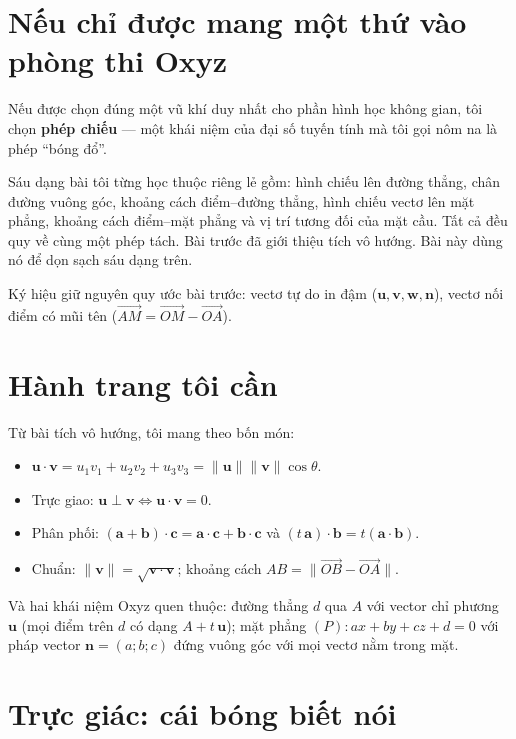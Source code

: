 \documentclass[12pt,a4paper]{article}
\begin{document}
\section{Nếu chỉ được mang một thứ vào phòng thi Oxyz}

Nếu được chọn đúng một vũ khí duy nhất cho phần hình học không gian, tôi chọn \textbf{phép chiếu} --- một khái niệm của đại số tuyến tính mà tôi gọi nôm na là phép ``bóng đổ''.

Sáu dạng bài tôi từng học thuộc riêng lẻ gồm: hình chiếu lên đường thẳng, chân đường vuông góc, khoảng cách điểm--đường thẳng, hình chiếu vectơ lên mặt phẳng, khoảng cách điểm--mặt phẳng và vị trí tương đối của mặt cầu. Tất cả đều quy về cùng một phép tách. Bài trước đã giới thiệu tích vô hướng. Bài này dùng nó để dọn sạch sáu dạng trên.

Ký hiệu giữ nguyên quy ước bài trước: vectơ tự do in đậm ($\mathbf{u}, \mathbf{v}, \mathbf{w}, \mathbf{n}$), vectơ nối điểm có mũi tên ($\overrightarrow{AM} = \overrightarrow{OM}-\overrightarrow{OA}$).

\section{Hành trang tôi cần}

Từ bài tích vô hướng, tôi mang theo bốn món:

\begin{itemize}
  \item $\mathbf{u}\cdot\mathbf{v} = u_1v_1+u_2v_2+u_3v_3 = \|\mathbf{u}\|\|\mathbf{v}\|\cos\theta$.
  \item Trực giao: $\mathbf{u} \perp \mathbf{v} \Leftrightarrow \mathbf{u}\cdot\mathbf{v} = 0$.
  \item Phân phối: $(\mathbf{a}+\mathbf{b})\cdot\mathbf{c} = \mathbf{a}\cdot\mathbf{c} + \mathbf{b}\cdot\mathbf{c}$ và $(t\,\mathbf{a})\cdot\mathbf{b} = t(\mathbf{a}\cdot\mathbf{b})$.
  \item Chuẩn: $\|\mathbf{v}\| = \sqrt{\mathbf{v}\cdot\mathbf{v}}$; khoảng cách $AB = \|\overrightarrow{OB}-\overrightarrow{OA}\|$.
\end{itemize}

Và hai khái niệm Oxyz quen thuộc: đường thẳng $d$ qua $A$ với vector chỉ phương $\mathbf{u}$ (mọi điểm trên $d$ có dạng $A+t\,\mathbf{u}$); mặt phẳng $(P): ax+by+cz+d=0$ với pháp vector $\mathbf{n}=(a;b;c)$ đứng vuông góc với mọi vectơ nằm trong mặt.

\section{Trực giác: cái bóng biết nói}
\end{document}
